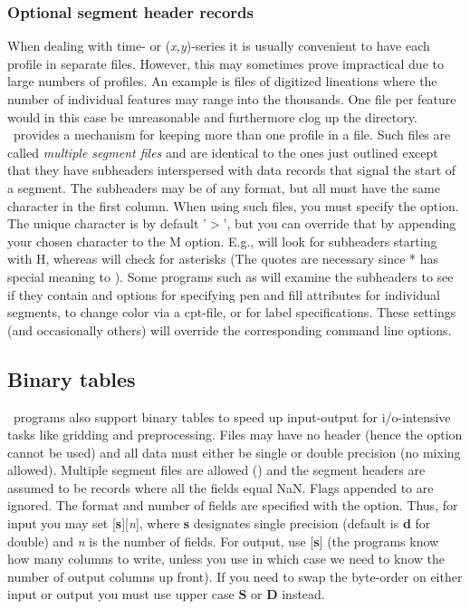\subsubsection{Optional segment header records}
When dealing with time- or ({\it x,y})-series it is usually
convenient to have each profile in separate files.
However, this may sometimes prove impractical due to large numbers
of profiles.  An example is files of digitized lineations where
the number of individual features may range into the thousands.
One file per feature would in this case be unreasonable and
furthermore clog up the directory. \GMT\ provides a mechanism for
keeping more than one profile in a file.  Such files are called
\emph{multiple segment files} and are identical to the ones
just outlined except that they have subheaders interspersed with
data records that signal the start of a segment.
The subheaders may be of any format, but all must have the same
character in the first column.  When using such files, you must
specify the  option.  The unique character is by default
'$>$', but you can override that by appending your chosen character
to the M option.  E.g.,  will look for subheaders starting
with H, whereas  will check for asterisks (The quotes
are necessary since * has special meaning to \UNIX).  Some programs
such as  will examine the subheaders to see if they
contain  and  options for specifying pen and
fill attributes for individual segments,  to change
color via a cpt-file, or  for label specifications.  These settings
(and occasionally others) will override the corresponding command line options.

\subsection{Binary tables}

\GMT\ programs also support binary tables to speed up input-output
for i/o-intensive tasks like gridding and preprocessing.  Files
may have no header (hence the  option cannot be used)
and all data must either be single or double precision (no mixing
allowed).  Multiple segment files are allowed () and the
segment headers are assumed to be records where all the fields equal 
NaN.  Flags appended to  are ignored.  The format and number
of fields are specified with the
 option.  Thus, for input you may set [{\bf s}][{\it n}],
where {\bf s} designates single precision (default is {\bf d} for double) and
{\it n} is the number of fields.  For output, use [{\bf s}] 
(the programs know how many columns to write, unless you use  in which
case we need to know the number of output columns up front).  If you need
to swap the byte-order on either input or output you must use upper case
{\bf S} or {\bf D} instead.

